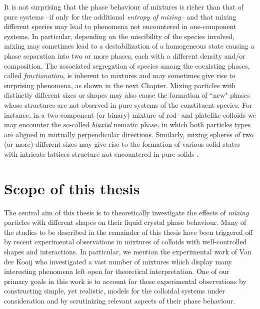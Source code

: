 {It is not surprising that the phase behaviour of  mixtures is richer than that of pure systems
--if only for the additional {\em entropy of mixing}-- and
that mixing different species may lead to  phenomena not encountered in one-component systems.
In particular, depending on the miscibility of the species involved,  mixing
may sometimes lead to a destabilization of a homogeneous state
causing a phase separation into two or more phases, each with a different
density and/or composition. The associated segregation of species among the coexisting phases,
called  {\em fractionation}, is inherent to mixtures and may sometimes give rise to surprising phenomena,
as shown in the next Chapter.
Mixing particles with distinctly different sizes or shapes
may also cause the formation of ``new" phases whose structures are not observed in pure systems
of the constituent species. For instance, in a two-component (or binary) mixture
 of rod- and platelike colloids we may encounter the so-called {\em biaxial} nematic
phase, in which both particles types are aligned
in mutually perpendicular directions. Similarly, mixing spheres of two (or more) different sizes
may give rise to the formation of various solid states with intricate
lattices structure  not encountered in pure solids \cite{Bartlettbinary}.


\section{Scope of this thesis}
The central aim of this thesis is to theoretically investigate
the effects of  {\em mixing}  particles with different shapes
on their liquid crystal phase behaviour.
Many of the studies to be described in the remainder of this thesis have been triggered off
by recent experimental observations in mixtures of colloids with well-controlled shapes
and interactions.
In particular, we mention the experimental work of Van der Kooij \cite{felixthesis} who investigated a vast number
of mixtures which display many interesting phenomena left open for theoretical interpretation.
One of our primary goals in this work is to account for these
experimental observations by constructing simple, yet realistic,  models
for the colloidal systems under consideration
and by scrutinizing relevant aspects of their phase behaviour.

}
